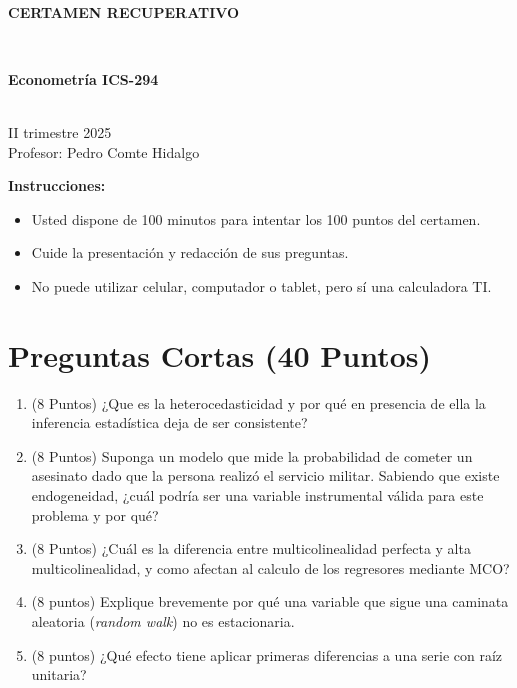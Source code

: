 \documentclass[10pt,a4paper]{article}
\begin{document}
\vspace{5cm}



\begin{center}
\begin{large}
\textbf{\\CERTAMEN RECUPERATIVO}
\end{large}\\
\end{center}

\begin{center}
\begin{large}
\textbf{Econometría ICS-294}
\end{large}\\
\vspace{0.2cm}
II trimestre 2025\\
Profesor: Pedro Comte Hidalgo
\end{center}

\textbf{Instrucciones:} 

\begin{itemize}

    \item Usted dispone de 100 minutos  para intentar los 100 puntos del certamen.
    \item Cuide la presentación y redacción de sus preguntas.
    \item No puede utilizar celular, computador o tablet, pero sí una calculadora TI.
     
\end{itemize}



\section{Preguntas Cortas (40 Puntos)}

\begin{enumerate}

\item (8 Puntos) ¿Que es la heterocedasticidad y por qué en presencia de ella la inferencia estadística deja de ser consistente?

\item (8 Puntos) Suponga un modelo que mide la probabilidad de cometer un asesinato dado que la persona realizó el servicio militar. Sabiendo que existe endogeneidad, ¿cuál podría ser una variable instrumental válida para este problema y por qué? 

\item (8 Puntos) ¿Cuál es la diferencia entre multicolinealidad perfecta y alta multicolinealidad, y como afectan al calculo de los regresores mediante MCO?

\item (8 puntos) Explique brevemente por qué una variable que sigue una caminata aleatoria (\textit{random walk}) no es estacionaria.

\item (8 puntos) ¿Qué efecto tiene aplicar primeras diferencias a una serie con raíz unitaria?

\end{enumerate}
\end{document}
